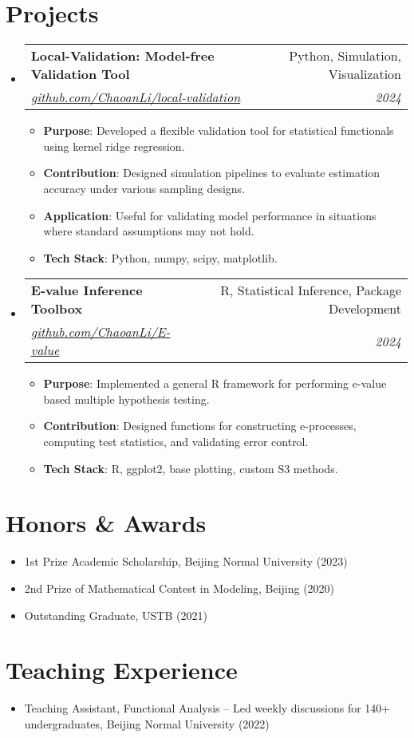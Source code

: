 \documentclass[a4paper,11pt]{article}
\makeatletter
\newcommand{\resumeItem}[2]{
  \item\small{\textbf{#1}{: #2 \vspace{-2pt}}}
}
\newcommand{\resumeSubheading}[4]{
  \vspace{-1pt}\item
    \begin{tabular*}{0.97\textwidth}{l@{\extracolsep{\fill}}r}
      \textbf{#1} & #2 \\
      \textit{#3} & \textit{#4} \\
    \end{tabular*}\vspace{-5pt}
}
\newcommand{\resumeSubHeadingListStart}{\begin{itemize}[leftmargin=*]}
\newcommand{\resumeSubHeadingListEnd}{\end{itemize}}
\newcommand{\resumeItemListStart}{\begin{itemize}}
\newcommand{\resumeItemListEnd}{\end{itemize}\vspace{-5pt}}
\makeatother
\begin{document}
\section*{Projects}
\resumeSubHeadingListStart

\resumeSubheading{Local-Validation: Model-free Validation Tool}{Python, Simulation, Visualization}{\href{https://github.com/ChaoanLi/local-validation}{github.com/ChaoanLi/local-validation}}{2024}
\resumeItemListStart
\resumeItem{Purpose}{Developed a flexible validation tool for statistical functionals using kernel ridge regression.}
\resumeItem{Contribution}{Designed simulation pipelines to evaluate estimation accuracy under various sampling designs.}
\resumeItem{Application}{Useful for validating model performance in situations where standard assumptions may not hold.}
\resumeItem{Tech Stack}{Python, numpy, scipy, matplotlib.}
\resumeItemListEnd

\resumeSubheading{E-value Inference Toolbox}{R, Statistical Inference, Package Development}{\href{https://github.com/ChaoanLi/E-value}{github.com/ChaoanLi/E-value}}{2024}
\resumeItemListStart
\resumeItem{Purpose}{Implemented a general R framework for performing e-value based multiple hypothesis testing.}
\resumeItem{Contribution}{Designed functions for constructing e-processes, computing test statistics, and validating error control.}
\resumeItem{Tech Stack}{R, ggplot2, base plotting, custom S3 methods.}
\resumeItemListEnd

\resumeSubHeadingListEnd

\section*{Honors \& Awards}
\begin{itemize}
  \item 1st Prize Academic Scholarship, Beijing Normal University (2023)
  \item 2nd Prize of Mathematical Contest in Modeling, Beijing (2020)
  \item Outstanding Graduate, USTB (2021)
\end{itemize}

\section*{Teaching Experience}
\begin{itemize}
  \item Teaching Assistant, Functional Analysis – Led weekly discussions for 140+ undergraduates, Beijing Normal University (2022)
\end{itemize}
\end{document}
